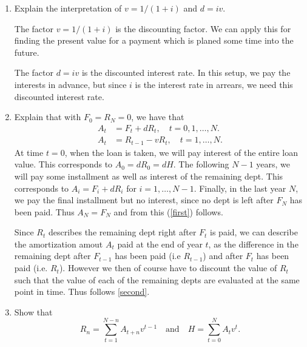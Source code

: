 \documentclass[a4paper,colorinlistoftodos, 10pt]{article}
\begin{document}
\begin{enumerate}
\item Explain the interpretation of $v=1/(1+i)$ and $d = iv$.

The factor $v=1/(1+i)$ is the discounting factor. We can apply this for finding the present value for a payment which is planed some time into the future. 

The factor $d = iv$ is the discounted interest rate. In this setup, we pay the interests in advance, but since $i$ is the interest rate in arrears, we need this discounted interest rate.

\item Explain that with $F_0=R_N=0$, we have that
\begin{align}
A_t & = F_t + dR_t, \quad t = 0,1, \dots, N. \label{first} \\
A_t & = R_{t-1} - vR_t, \quad t = 1, \dots, N. \label{second}
\end{align}
At time $t=0$, when the loan is taken, we will pay interest of the entire loan value. This corresponds to $A_0 = dR_0 = dH$. The following $N-1$ years, we will pay some installment as well as interest of the remaining dept. This corresponds to $A_i = F_i + dR_i$ for $i=1,\dots, N-1$. Finally, in the last year $N$, we pay the final installment but no interest, since no dept is left after $F_N$ has been paid. Thus $A_N=F_N$ and from this (\ref{first}) follows.

Since $R_t$ describes the remaining dept right after $F_t$ is paid, we can describe the amortization amout $A_t$ paid at the end of year $t$, as the difference in the remaining dept after $F_{t-1}$ has been paid (i.e $R_{t-1}$) and after $F_t$ has been paid (i.e. $R_t$). However we then of course have to discount the value of $R_t$ such that the value of each of the remaining depts are evaluated at the same point in time. Thus follows \ref{second}.


\item Show that 
\begin{equation*}
R_n = \sum_{t=1}^{N-n} A_{t+n} v^{t-1} \quad \text{and}\quad H = \sum_{t=0}^N A_t v^t.
\end{equation*}


\end{enumerate}
\end{document}

